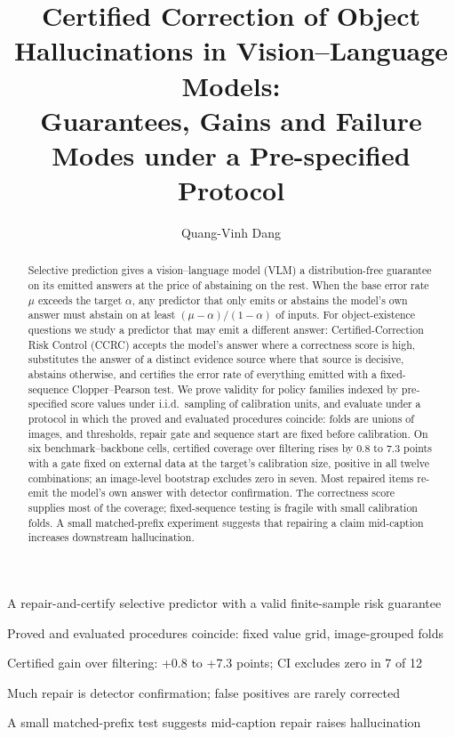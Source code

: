 \documentclass[review,number]{elsarticle}
\theoremstyle{plain}
\theoremstyle{definition}
\theoremstyle{remark}
\begin{document}
\begin{frontmatter}
\title{Certified Correction of Object Hallucinations in Vision--Language Models:\\
Guarantees, Gains and Failure Modes under a Pre-specified Protocol}

\author[bu]{Quang-Vinh Dang}
\address[bu]{British University Vietnam, Hung Yen, Vietnam}

\begin{abstract}
Selective prediction gives a vision--language model (VLM) a distribution-free guarantee on its emitted answers
at the price of abstaining on the rest. When the base error rate $\mu$ exceeds the target $\alpha$, any
predictor that only emits or abstains the model's own answer must abstain on at least $(\mu-\alpha)/(1-\alpha)$ of
inputs. For object-existence questions we study a predictor that may emit a different answer: Certified-Correction Risk Control (CCRC) accepts the
model's answer where a correctness score is high, substitutes the answer of a distinct evidence source where that source is decisive, abstains otherwise, and certifies the error rate of
everything emitted with a fixed-sequence Clopper--Pearson test. We prove validity for policy families indexed by
pre-specified score values under i.i.d.\ sampling of calibration units, and evaluate under a protocol in which the
proved and evaluated procedures coincide: folds are unions of images, and thresholds, repair gate and sequence start
are fixed before calibration. On six benchmark--backbone cells, certified coverage over filtering rises by $0.8$ to $7.3$
points with a gate fixed on external data at the target's calibration size, positive in all twelve combinations; an image-level bootstrap excludes zero in seven. Most repaired items re-emit the model's own answer with
detector confirmation. The correctness score supplies most of the coverage; fixed-sequence testing is fragile with small calibration folds. A small matched-prefix experiment suggests that repairing a claim mid-caption increases downstream
hallucination.
\end{abstract}

\begin{highlights}
\item A repair-and-certify selective predictor with a valid finite-sample risk guarantee
\item Proved and evaluated procedures coincide: fixed value grid, image-grouped folds
\item Certified gain over filtering: +0.8 to +7.3 points; CI excludes zero in 7 of 12
\item Much repair is detector confirmation; false positives are rarely corrected
\item A small matched-prefix test suggests mid-caption repair raises hallucination
\end{highlights}


\end{frontmatter}
\end{document}

